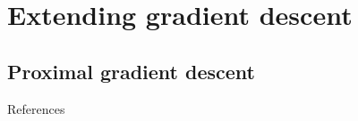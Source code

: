 \documentclass{beamer}
\numberwithin{equation}{section}
\begin{document}
\section{Extending gradient descent}

\subsection{Proximal gradient descent}

\begin{frame}{References}
    
    
\end{frame}
\end{document}
